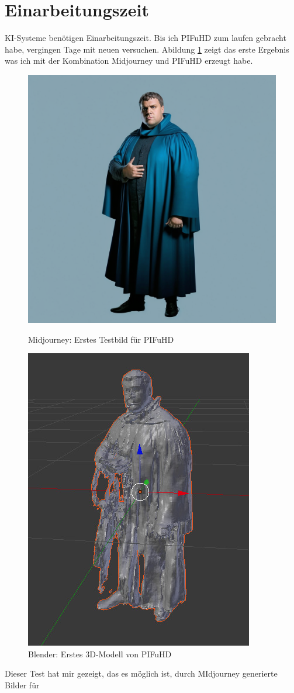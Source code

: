\section{Einarbeitungszeit}
KI-Systeme benötigen Einarbeitungszeit. Bis ich PIFuHD zum laufen gebracht habe, vergingen Tage mit neuen versuchen. Abildung \ref{erstemalpifuhdblender} zeigt das erste Ergebnis was ich mit der Kombination Midjourney und PIFuHD erzeugt habe.
\begin{figure}
	\centering
	\begin{minipage}[t]{0.45\linewidth}
		\centering
		\includegraphics[width=6.405cm\linewidth]{BilderFuerBA/ersteMalPIFuHD}
		\caption{Midjourney: Erstes Testbild für PIFuHD}
		\label{erstemalpifuhd}
	\end{minipage}
	\hfill
	\begin{minipage}[t]{0.45\linewidth}
		\centering
		\includegraphics[width=6.405cm\linewidth]{BilderFuerBA/ErsteMalPIFuHDblender}
		\caption{Blender: Erstes 3D-Modell von PIFuHD}
		\label{erstemalpifuhdblender}
	\end{minipage}
\end{figure}
Dieser Test hat mir gezeigt, das es möglich ist, durch MIdjourney generierte Bilder für
